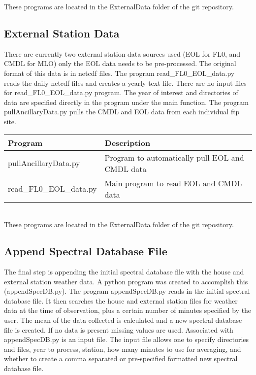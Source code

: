\documentclass[12pt, letterpaper]{article}
\begin{document}
These programs are located in the ExternalData folder of the git repository.


\subsection{External Station Data}
\label{sec:ED}

There are currently two external station data sources used (EOL for FL0, and CMDL for MLO) only the EOL data needs to be pre-processed. The original format of this data is in netcdf files. The program read\_FL0\_EOL\_data.py reads the daily netcdf files and creates a yearly text file. There are no input files for read\_FL0\_EOL\_data.py program. The year of interest and directories of data are specified directly in the program under the main function.  The program pullAncillaryData.py pulls the CMDL and EOL data from each individual ftp site. \\

\begin{tabular}{ l l }
\textbf{Program} & \textbf{Description} \\
\hline
pullAncillaryData.py    & Program to automatically pull EOL and CMDL data\\
read\_FL0\_EOL\_data.py & Main program to read EOL and CMDL data \\
\end{tabular} \\

\noindent These programs are located in the ExternalData folder of the git repository.

\subsection{Append Spectral Database File}
\label{sec:ASDF}
The final step is appending the initial spectral database file with the house and external station weather data. A python program was created to accomplish this (appendSpecDB.py). The program appendSpecDB.py reads in the initial spectral database file. It then searches the house and external station files for weather data at the time of observation, plus a certain number of minutes specified by the user. The mean of the data collected is calculated and a new spectral database file is created. If no data is present missing values are used. Associated with appendSpecDB.py is an input file. The input file allows one to specify directories and files, year to process, station, how many minutes to use for averaging, and whether to create a comma separated or pre-specified formatted new spectral database file.\\
\end{document}
